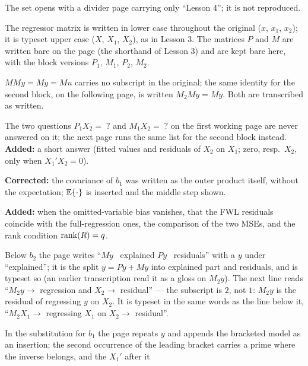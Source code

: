 \documentclass[11pt]{article}
\begin{document}
\begin{transcriptnotes}
  \item The set opens with a divider page carrying only ``Lesson 4''; it is not
        reproduced.
  \item The regressor matrix is written in lower case throughout the original
        ($x$, $x_{1}$, $x_{2}$); it is typeset upper case ($X$, $X_{1}$, $X_{2}$),
        as in Lesson 3. The matrices $P$ and $M$ are written bare on the page (the
        shorthand of Lesson 3) and are kept bare here, with the block versions
        $P_{1}$, $M_{1}$, $P_{2}$, $M_{2}$.
  \item $MMy = My = Mu$ carries no subscript in the original; the same identity for
        the second block, on the following page, is written $M_{2}My = My$. Both
        are transcribed as written.
  \item The two questions $P_{1}X_{2} = \;?$ and $M_{1}X_{2} = \;?$ on the first
        working page are never answered on it; the next page runs the same list for
        the second block instead. \textbf{Added:} a short answer (fitted values and
        residuals of $X_{2}$ on $X_{1}$; zero, resp.\ $X_{2}$, only when
        $X_{1}'X_{2} = 0$).
  \item \textbf{Corrected:} the covariance of $b_{1}$ was written as the outer
        product itself, without the expectation; $\mathbb{E}\{\cdot\}$ is inserted and the
        middle step shown.
  \item \textbf{Added:} when the omitted-variable bias vanishes, that the FWL
        residuals coincide with the full-regression ones, the comparison of the two
        MSEs, and the rank condition $\operatorname{rank}(R) = q$.
  \item Below $b_{2}$ the page writes ``$My$ \ explained $Py$ \ residuals'' with a
        $y$ under ``explained''; it is the split $y = Py + My$ into explained part
        and residuals, and is typeset so (an earlier transcription read it as a gloss
        on $M_{2}y$). The next line reads ``$M_{2}y \to$ regression and $X_{2} \to$
        residual'' --- the subscript is $2$, not $1$: $M_{2}y$ is the residual of
        regressing $y$ on $X_{2}$. It is typeset in the same words as the line
        below it, ``$M_{2}X_{1} \to$ regressing $X_{1}$ on $X_{2} \to$ residual''.
  \item In the substitution for $b_{1}$ the page repeats $y$ and appends the
        bracketed model as an insertion; the second occurrence of the leading
        bracket carries a prime where the inverse belongs, and the $X_{1}'$ after it

\end{transcriptnotes}
\end{document}
